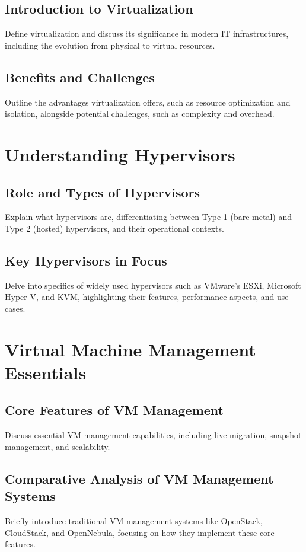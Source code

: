 \documentclass{kththesis}
\begin{document}
\subsection{Introduction to Virtualization}
Define virtualization and discuss its significance in modern IT infrastructures, including the evolution from physical to virtual resources.
\subsection{Benefits and Challenges}
Outline the advantages virtualization offers, such as resource optimization and isolation, alongside potential challenges, such as complexity and overhead.

\section{Understanding Hypervisors}
\subsection{Role and Types of Hypervisors}
Explain what hypervisors are, differentiating between Type 1 (bare-metal) and Type 2 (hosted) hypervisors, and their operational contexts.
\subsection{Key Hypervisors in Focus}
Delve into specifics of widely used hypervisors such as VMware's ESXi, Microsoft Hyper-V, and KVM, highlighting their features, performance aspects, and use cases.

\section{Virtual Machine Management Essentials}
\subsection{Core Features of VM Management}
Discuss essential VM management capabilities, including live migration, snapshot management, and scalability.
\subsection{Comparative Analysis of VM Management Systems}
Briefly introduce traditional VM management systems like OpenStack, CloudStack, and OpenNebula, focusing on how they implement these core features.
\end{document}

